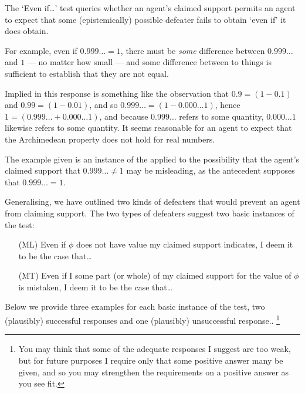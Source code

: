 \begin{note}
  The `Even if\dots' test queries whether an agent's claimed support permits an agent to expect that some (epistemically) possible defeater fails to obtain `even if' it does obtain.

  For example, even if \(0.999\dots = 1\), there must be \emph{some} difference between \(0.999\dots\) and \(1\) --- no matter how small --- and some difference between to things is sufficient to establish that they are not equal.

  Implied in this response is something like the observation that \(0.9 = (1 - 0.1)\) and \(0.99 = (1 - 0.01)\), and so \(0.999\dots = (1 - 0.000\dots 1)\), hence \(1 = (0.999\dots + 0.000\dots 1)\), and because \(0.999\dots\) refers to some quantity, \(0.000\dots 1\) likewise refers to some quantity.
  It seems reasonable for an agent to expect that the Archimedean property does not hold for real numbers.

  The example given is an instance of the applied to the possibility that the agent's claimed support that \(0.999\dots \ne 1\) may be misleading, as the antecedent supposes that \(0.999\dots = 1\).

  Generalising, we have outlined two kinds of defeaters that would prevent an agent from claiming support.
  The two types of defeaters suggest two basic instances of the test:
  \begin{enumerate}
  \item[(ML)] Even if \(\phi\) does not have value my claimed support indicates, I deem it to be the case that\dots
  \item[(MT)] Even if I some part (or whole) of my claimed support for the value of \(\phi\) is mistaken, I deem it to be the case that\dots
  \end{enumerate}
  Below we provide three examples for each basic instance of the test, two (plausibly) successful responses and one (plausibly) unsuccessful response..\nolinebreak
  \footnote{
    You may think that some of the adequate responses I suggest are too weak, but for future purposes I require only that some positive answer many be given, and so you may strengthen the requirements on a positive answer as you see fit.
  }
\end{note}

